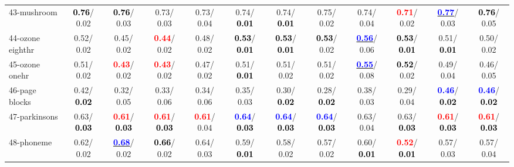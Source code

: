 \begin{table}[h]
\begin{center}
{\begin{tabular}{lc|c|c|c|c|c|c|c|c|c|c}
43-mushroom & \textcolor{black}{\textbf{  0.76}}/  0.02 & \textcolor{black}{\textbf{  0.76}}/  0.03 &   0.73/  0.03 &   0.73/  0.04 &   0.74/\textcolor{black}{\textbf{  0.01}} &   0.74/\textcolor{black}{\textbf{  0.01}} &   0.75/  0.02 &   0.74/  0.04 & \textcolor{red}{\textbf{  0.71}}/  0.02 & \underline{\textcolor{blue}{\textbf{  0.77}}}/  0.03 & \textcolor{black}{\textbf{  0.76}}/  0.05 \\
44-ozone eighthr &   0.52/  0.02 &   0.45/  0.02 & \textcolor{red}{\textbf{  0.44}}/  0.02 &   0.48/  0.02 & \textcolor{black}{\textbf{  0.53}}/\textcolor{black}{\textbf{  0.01}} & \textcolor{black}{\textbf{  0.53}}/\textcolor{black}{\textbf{  0.01}} & \textcolor{black}{\textbf{  0.53}}/  0.02 & \underline{\textcolor{blue}{\textbf{  0.56}}}/  0.06 & \textcolor{black}{\textbf{  0.53}}/\textcolor{black}{\textbf{  0.01}} &   0.51/\textcolor{black}{\textbf{  0.01}} &   0.50/  0.02 \\
45-ozone onehr &   0.51/  0.02 & \textcolor{red}{\textbf{  0.43}}/  0.02 & \textcolor{red}{\textbf{  0.43}}/  0.02 &   0.47/  0.02 &   0.51/\textcolor{black}{\textbf{  0.01}} &   0.51/  0.02 &   0.51/  0.02 & \underline{\textcolor{blue}{\textbf{  0.55}}}/  0.08 & \textcolor{black}{\textbf{  0.52}}/  0.02 &   0.49/  0.04 &   0.46/  0.05 \\
46-page blocks &   0.42/\textcolor{black}{\textbf{  0.02}} &   0.32/  0.05 &   0.33/  0.06 &   0.34/  0.06 &   0.35/  0.03 &   0.30/\textcolor{black}{\textbf{  0.02}} &   0.28/\textcolor{black}{\textbf{  0.02}} &   0.38/  0.03 &   0.29/  0.04 & \textcolor{blue}{\textbf{  0.46}}/\textcolor{black}{\textbf{  0.02}} & \textcolor{blue}{\textbf{  0.46}}/\textcolor{black}{\textbf{  0.02}} \\ \hline
47-parkinsons &   0.63/\textcolor{black}{\textbf{  0.03}} & \textcolor{red}{\textbf{  0.61}}/\textcolor{black}{\textbf{  0.03}} & \textcolor{red}{\textbf{  0.61}}/\textcolor{black}{\textbf{  0.03}} & \textcolor{red}{\textbf{  0.61}}/  0.04 & \textcolor{blue}{\textbf{  0.64}}/\textcolor{black}{\textbf{  0.03}} & \textcolor{blue}{\textbf{  0.64}}/\textcolor{black}{\textbf{  0.03}} & \textcolor{blue}{\textbf{  0.64}}/\textcolor{black}{\textbf{  0.03}} &   0.63/  0.04 &   0.63/\textcolor{black}{\textbf{  0.03}} & \textcolor{red}{\textbf{  0.61}}/\textcolor{black}{\textbf{  0.03}} & \textcolor{red}{\textbf{  0.61}}/\textcolor{black}{\textbf{  0.03}} \\
48-phoneme &   0.62/  0.02 & \underline{\textcolor{blue}{\textbf{  0.68}}}/  0.02 & \textcolor{black}{\textbf{  0.66}}/  0.02 &   0.64/  0.03 &   0.59/\textcolor{black}{\textbf{  0.01}} &   0.58/  0.02 &   0.57/  0.02 &   0.60/\textcolor{black}{\textbf{  0.01}} & \textcolor{red}{\textbf{  0.52}}/\textcolor{black}{\textbf{  0.01}} &   0.57/  0.03 &   0.57/  0.04 \\

\end{tabular}}
\end{center}
\end{table}
